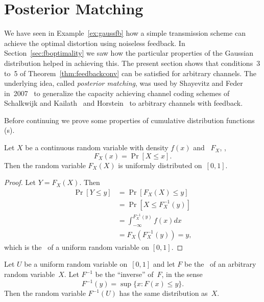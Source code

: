 \section{Posterior Matching}

We have seen in Example~\ref{ex:gaussfb} how a simple transmission scheme can
achieve the optimal distortion using noiseless feedback. In
Section~\ref{sec:fboptimality} we saw how the particular properties of the
Gaussian distribution helped in achieving this. The present section shows that
conditions~3 to~5 of Theorem~\ref{thm:feedbackconv} can be satisfied for
arbitrary channels. The underlying idea, called \emph{posterior matching}, was
used by Shayevitz and Feder in~2007~\cite{ShayevitzF2007,ShayevitzF2008} to
generalize the capacity achieving channel coding schemes of Schalkwijk and
Kailath~\cite{SchalkwijkK1966} and Horstein~\cite{Horstein1963} to arbitrary
channels with feedback.

Before continuing we prove some properties of cumulative distribution functions
(\cdf s).

\begin{lemma}
  \label{lem:cdfunif}
  Let $X$ be a continuous random variable with density $f(x)$ and \cdf\ $F_X$,
  \ie,
  \begin{equation*}
    F_X(x) = \Pr[X \le x].
  \end{equation*}
  Then the random variable $F_X(X)$ is uniformly distributed on~$[0,1]$.
\end{lemma}

\begin{proof}
  Let $Y = F_X(X)$. Then
  \begin{align*}
    \Pr[Y \le y] &= \Pr[F_X(X) \le y] \\
    &= \Pr[X \le F_X^{-1}(y)] \\
    &= \int_{-\infty}^{F_X^{-1}(y)} f(x) dx \\
    &= F_X(F_X^{-1}(y)) = y,
  \end{align*}
  which is the \cdf\ of a uniform random variable on $[0,1]$.
\end{proof}


\begin{lemma}
  \label{lem:invcdf}
  Let $U$ be a uniform random variable on~$[0,1]$ and let $F$ be the \cdf\ of an
  arbitrary random variable~$X$. Let $F^{-1}$ be the ``inverse'' of~$F$, in the
  sense
  \begin{equation}
    \label{eq:invcdf}
    F^{-1}(y) = \sup \{x : F(x) \le y\}.
  \end{equation}
  Then the random variable $F^{-1}(U)$ has the same distribution as~$X$.
\end{lemma}

